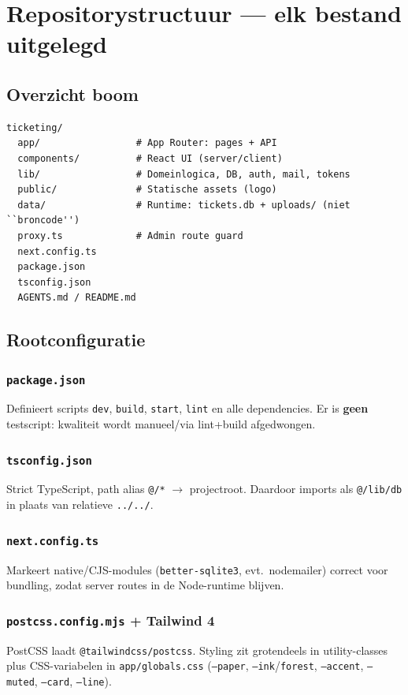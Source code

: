 \documentclass[11pt,a4paper]{report}
\begin{document}
\chapter{Repositorystructuur --- elk bestand uitgelegd}

\section{Overzicht boom}
\begin{lstlisting}
ticketing/
  app/                 # App Router: pages + API
  components/          # React UI (server/client)
  lib/                 # Domeinlogica, DB, auth, mail, tokens
  public/              # Statische assets (logo)
  data/                # Runtime: tickets.db + uploads/ (niet ``broncode'')
  proxy.ts             # Admin route guard
  next.config.ts
  package.json
  tsconfig.json
  AGENTS.md / README.md
\end{lstlisting}

\section{Rootconfiguratie}

\subsection{\texttt{package.json}}
Definieert scripts \texttt{dev}, \texttt{build}, \texttt{start}, \texttt{lint} en alle dependencies.
Er is \textbf{geen} testscript: kwaliteit wordt manueel/via lint+build afgedwongen.

\subsection{\texttt{tsconfig.json}}
Strict TypeScript, path alias \texttt{@/*} $\to$ projectroot. Daardoor imports als
\texttt{@/lib/db} in plaats van relatieve \texttt{../../}.

\subsection{\texttt{next.config.ts}}
Markeert native/CJS-modules (\texttt{better-sqlite3}, evt.\ nodemailer) correct voor bundling,
zodat server routes in de Node-runtime blijven.

\subsection{\texttt{postcss.config.mjs} + Tailwind 4}
PostCSS laadt \texttt{@tailwindcss/postcss}. Styling zit grotendeels in utility-classes plus
CSS-variabelen in \texttt{app/globals.css} (\texttt{--paper}, \texttt{--ink}/\texttt{forest},
\texttt{--accent}, \texttt{--muted}, \texttt{--card}, \texttt{--line}).
\end{document}
